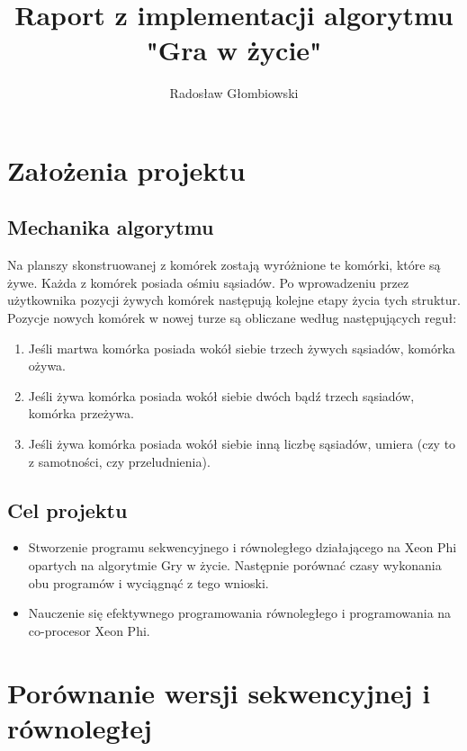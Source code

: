 \documentclass[a4paper]{article}
\title{Raport z implementacji algorytmu "Gra w życie"}
\author{Radosław Głombiowski}
\begin{document}
\maketitle

\tableofcontents

\section{Założenia projektu}
\subsection{Mechanika algorytmu}
Na planszy skonstruowanej z komórek zostają wyróżnione te komórki, które są żywe. Każda z komórek posiada ośmiu sąsiadów.
Po wprowadzeniu przez użytkownika pozycji żywych komórek następują kolejne etapy życia tych struktur.
Pozycje nowych komórek w nowej turze są obliczane według następujących reguł:
\begin{enumerate}
\item Jeśli martwa komórka posiada wokół siebie trzech żywych sąsiadów, komórka ożywa.
\item Jeśli żywa komórka posiada wokół siebie dwóch bądź trzech sąsiadów, komórka przeżywa.
\item Jeśli żywa komórka posiada wokół siebie inną liczbę sąsiadów, umiera (czy to z samotności, czy przeludnienia).
\end{enumerate}

\subsection{Cel projektu}
\begin{itemize}
\item Stworzenie programu sekwencyjnego i równoległego działającego na Xeon Phi opartych na algorytmie Gry w życie. Następnie porównać czasy wykonania obu programów i wyciągnąć z tego wnioski. 
\item Nauczenie się efektywnego programowania równoległego i programowania na co-procesor Xeon Phi.
\end{itemize}

\newpage

\section{Porównanie wersji sekwencyjnej i równoległej}
\end{document}
